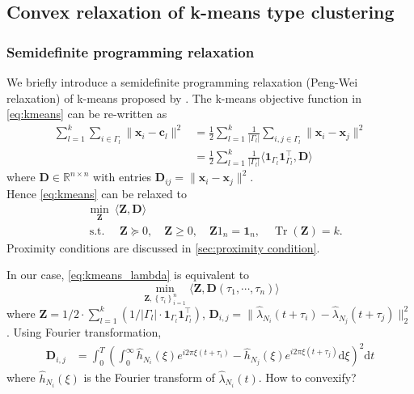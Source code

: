 
	\subsection{Convex relaxation of k-means type clustering}
		\subsubsection*{Semidefinite programming relaxation}
			We briefly introduce a semidefinite programming relaxation (Peng-Wei relaxation) of k-means proposed by \citet{Peng2005}.
			The k-means objective function in \eqref{eq:kmeans} can be re-written as
			\begin{align*}
			\sum_{l=1}^k\sum_{i\in\Gamma_l}\|\mathbf{x}_i- \mathbf{c}_l\|^2 &= \frac{1}{2}\sum_{l=1}^k \frac{1}{|\Gamma_l|}\sum_{i,j\in\Gamma_l}\|\mathbf{x}_i - \mathbf{x}_j\|^2\\
			&= \frac{1}{2}\sum_{l=1}^k\frac{1}{|\Gamma_l|}\langle \mathbf{1}_{\Gamma_l}\mathbf{1}_{\Gamma_l}^\top,\mathbf{D} \rangle
			\end{align*}
			where $\mathbf{D}\in \mathbb{R}^{n\times n}$ with entries $\mathbf{D}_{ij}=\|\mathbf{x}_i- \mathbf{x}_j\|^2$.
			\\
			Hence \eqref{eq:kmeans} can be relaxed to
			\begin{align*}
			&\min_{\mathbf{Z}}\ \langle \mathbf{Z},\mathbf{D}\rangle \qquad \\
			& \ \text{s.t. } \quad \mathbf{Z} \succeq 0, \quad \mathbf{Z} \geq 0, \quad \mathbf{Z} 1_{n}=\mathbf{1}_{n}, \quad \operatorname{Tr}(\mathbf{Z})=k.
			\end{align*}
		Proximity conditions are discussed in \ref{sec:proximity condition}.
		
		In our case, \eqref{eq:kmeans_lambda} is equivalent to 
			\begin{equation}\label{eq:unconvexified k-means}
			\min_{\mathbf{Z},\left\{ \tau_i \right\}_{i=1}^n}\langle \mathbf{Z}, \mathbf D(\tau_1,\cdots,\tau_n)  \rangle
			\end{equation}
		where $\mathbf{Z}=1/2\cdot \sum_{l=1}^k(1/|\Gamma_l|\cdot \mathbf{1}_{\Gamma_l}\mathbf{1}_{\Gamma_l}^\top)$, $\mathbf{D}_{i,j} = \| \hat\lambda_{N_i}(t+\tau_i)-\hat\lambda_{N_j}(t+\tau_j) \|_2^2$.
		Using Fourier transformation, 
		\begin{align*}
		\mathbf{D}_{i,j} &= \int_{0}^T \left( \int_0^\infty \hat h_{N_i}(\xi)e^{i2\pi\xi(t+\tau_i)}-\hat h_{N_j}(\xi)e^{i2\pi\xi(t+\tau_j)}\text{d}\xi \right)^2 \text{d}t
		\end{align*}
		where $\hat h_{N_i}(\xi)$ is the Fourier transform of $\hat\lambda_{N_i}(t)$. 
		{\color{red} How to convexify?}
		
		
		






